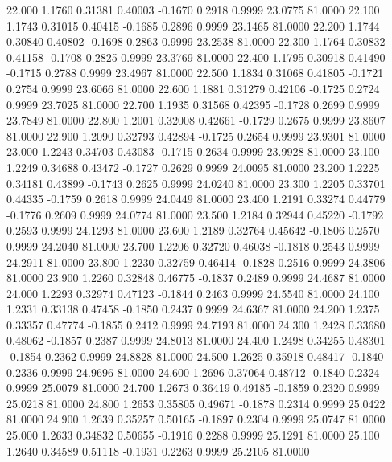   22.000   1.1760   0.31381   0.40003  -0.1670   0.2918   0.9999  23.0775  81.0000
  22.100   1.1743   0.31015   0.40415  -0.1685   0.2896   0.9999  23.1465  81.0000
  22.200   1.1744   0.30840   0.40802  -0.1698   0.2863   0.9999  23.2538  81.0000
  22.300   1.1764   0.30832   0.41158  -0.1708   0.2825   0.9999  23.3769  81.0000
  22.400   1.1795   0.30918   0.41490  -0.1715   0.2788   0.9999  23.4967  81.0000
  22.500   1.1834   0.31068   0.41805  -0.1721   0.2754   0.9999  23.6066  81.0000
  22.600   1.1881   0.31279   0.42106  -0.1725   0.2724   0.9999  23.7025  81.0000
  22.700   1.1935   0.31568   0.42395  -0.1728   0.2699   0.9999  23.7849  81.0000
  22.800   1.2001   0.32008   0.42661  -0.1729   0.2675   0.9999  23.8607  81.0000
  22.900   1.2090   0.32793   0.42894  -0.1725   0.2654   0.9999  23.9301  81.0000
  23.000   1.2243   0.34703   0.43083  -0.1715   0.2634   0.9999  23.9928  81.0000
  23.100   1.2249   0.34688   0.43472  -0.1727   0.2629   0.9999  24.0095  81.0000
  23.200   1.2225   0.34181   0.43899  -0.1743   0.2625   0.9999  24.0240  81.0000
  23.300   1.2205   0.33701   0.44335  -0.1759   0.2618   0.9999  24.0449  81.0000
  23.400   1.2191   0.33274   0.44779  -0.1776   0.2609   0.9999  24.0774  81.0000
  23.500   1.2184   0.32944   0.45220  -0.1792   0.2593   0.9999  24.1293  81.0000
  23.600   1.2189   0.32764   0.45642  -0.1806   0.2570   0.9999  24.2040  81.0000
  23.700   1.2206   0.32720   0.46038  -0.1818   0.2543   0.9999  24.2911  81.0000
  23.800   1.2230   0.32759   0.46414  -0.1828   0.2516   0.9999  24.3806  81.0000
  23.900   1.2260   0.32848   0.46775  -0.1837   0.2489   0.9999  24.4687  81.0000
  24.000   1.2293   0.32974   0.47123  -0.1844   0.2463   0.9999  24.5540  81.0000
  24.100   1.2331   0.33138   0.47458  -0.1850   0.2437   0.9999  24.6367  81.0000
  24.200   1.2375   0.33357   0.47774  -0.1855   0.2412   0.9999  24.7193  81.0000
  24.300   1.2428   0.33680   0.48062  -0.1857   0.2387   0.9999  24.8013  81.0000
  24.400   1.2498   0.34255   0.48301  -0.1854   0.2362   0.9999  24.8828  81.0000
  24.500   1.2625   0.35918   0.48417  -0.1840   0.2336   0.9999  24.9696  81.0000
  24.600   1.2696   0.37064   0.48712  -0.1840   0.2324   0.9999  25.0079  81.0000
  24.700   1.2673   0.36419   0.49185  -0.1859   0.2320   0.9999  25.0218  81.0000
  24.800   1.2653   0.35805   0.49671  -0.1878   0.2314   0.9999  25.0422  81.0000
  24.900   1.2639   0.35257   0.50165  -0.1897   0.2304   0.9999  25.0747  81.0000
  25.000   1.2633   0.34832   0.50655  -0.1916   0.2288   0.9999  25.1291  81.0000
  25.100   1.2640   0.34589   0.51118  -0.1931   0.2263   0.9999  25.2105  81.0000
